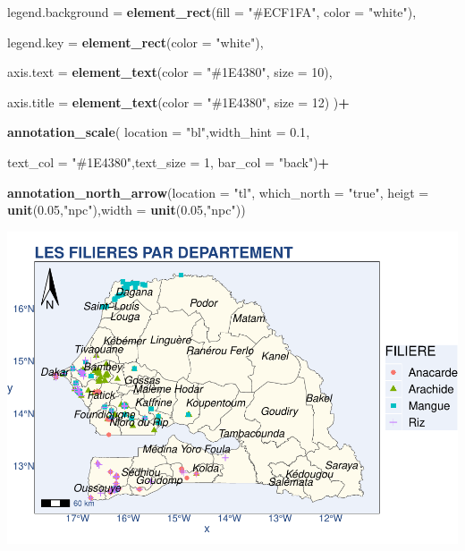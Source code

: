 \documentclass[
]{article}
\newenvironment{Shaded}{\begin{snugshade}}{\end{snugshade}}
\newcommand{\AttributeTok}[1]{\textcolor[rgb]{0.13,0.29,0.53}{#1}}
\newcommand{\DecValTok}[1]{\textcolor[rgb]{0.00,0.00,0.81}{#1}}
\newcommand{\FloatTok}[1]{\textcolor[rgb]{0.00,0.00,0.81}{#1}}
\newcommand{\FunctionTok}[1]{\textcolor[rgb]{0.13,0.29,0.53}{\textbf{#1}}}
\newcommand{\NormalTok}[1]{#1}
\newcommand{\SpecialCharTok}[1]{\textcolor[rgb]{0.81,0.36,0.00}{\textbf{#1}}}
\newcommand{\StringTok}[1]{\textcolor[rgb]{0.31,0.60,0.02}{#1}}
\begin{document}
\begin{Shaded}
\begin{Highlighting}[]
    \AttributeTok{legend.background =} \FunctionTok{element\_rect}\NormalTok{(}\AttributeTok{fill =} \StringTok{"\#ECF1FA"}\NormalTok{, }\AttributeTok{color =} \StringTok{"white"}\NormalTok{),}
    
    \AttributeTok{legend.key =} \FunctionTok{element\_rect}\NormalTok{(}\AttributeTok{color =} \StringTok{"white"}\NormalTok{),}
    
    \AttributeTok{axis.text =} \FunctionTok{element\_text}\NormalTok{(}\AttributeTok{color =} \StringTok{"\#1E4380"}\NormalTok{, }\AttributeTok{size =} \DecValTok{10}\NormalTok{),}
    
    \AttributeTok{axis.title =} \FunctionTok{element\_text}\NormalTok{(}\AttributeTok{color =} \StringTok{"\#1E4380"}\NormalTok{, }\AttributeTok{size =} \DecValTok{12}\NormalTok{)}
\NormalTok{  )}\SpecialCharTok{+}
  
  \FunctionTok{annotation\_scale}\NormalTok{( }\AttributeTok{location =} \StringTok{"bl"}\NormalTok{,}\AttributeTok{width\_hint =} \FloatTok{0.1}\NormalTok{,}
                    
  \AttributeTok{text\_col =} \StringTok{"\#1E4380"}\NormalTok{,}\AttributeTok{text\_size =} \DecValTok{1}\NormalTok{, }\AttributeTok{bar\_col =} \StringTok{"back"}\NormalTok{)}\SpecialCharTok{+}
  
    \FunctionTok{annotation\_north\_arrow}\NormalTok{(}\AttributeTok{location =} \StringTok{"tl"}\NormalTok{, }\AttributeTok{which\_north =} \StringTok{"true"}\NormalTok{,}
                         \AttributeTok{heigt =} \FunctionTok{unit}\NormalTok{(}\FloatTok{0.05}\NormalTok{,}\StringTok{"npc"}\NormalTok{),}\AttributeTok{width =} \FunctionTok{unit}\NormalTok{(}\FloatTok{0.05}\NormalTok{,}\StringTok{"npc"}\NormalTok{))}
\end{Highlighting}
\end{Shaded}

\includegraphics{PROJET_files/figure-latex/unnamed-chunk-25-1.pdf}
\end{document}
